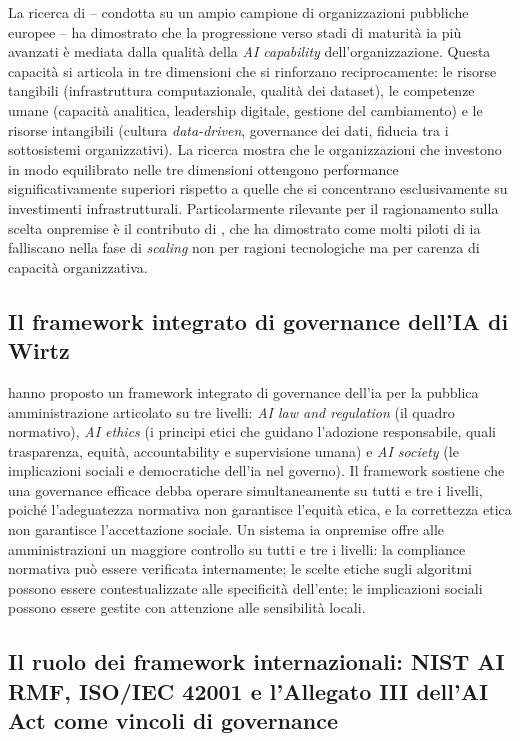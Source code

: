 La ricerca di \textcite{Mikalef2023} -- condotta su un ampio campione di organizzazioni pubbliche europee -- ha dimostrato che la progressione verso stadi di maturità \gls{ia} più avanzati è mediata dalla qualità della \textit{AI capability} dell'organizzazione. Questa capacità si articola in tre dimensioni che si rinforzano reciprocamente: le risorse tangibili (infrastruttura computazionale, qualità dei dataset), le competenze umane (capacità analitica, leadership digitale, gestione del cambiamento) e le risorse intangibili (cultura \textit{data-driven}, governance dei dati, fiducia tra i sottosistemi organizzativi). La ricerca mostra che le organizzazioni che investono in modo equilibrato nelle tre dimensioni ottengono performance significativamente superiori rispetto a quelle che si concentrano esclusivamente su investimenti infrastrutturali. Particolarmente rilevante per il ragionamento sulla scelta \gls{onpremise} è il contributo di \textcite{vanNoort2023}, che ha dimostrato come molti piloti di \gls{ia} falliscano nella fase di \textit{scaling} non per ragioni tecnologiche ma per carenza di capacità organizzativa.

\subsection{Il framework integrato di governance dell'IA di Wirtz}

\textcite{Wirtz2020} hanno proposto un framework integrato di governance dell'\gls{ia} per la pubblica amministrazione articolato su tre livelli: \textit{AI law and regulation} (il quadro normativo), \textit{AI ethics} (i principi etici che guidano l'adozione responsabile, quali trasparenza, equità, accountability e supervisione umana) e \textit{AI society} (le implicazioni sociali e democratiche dell'\gls{ia} nel governo). Il framework sostiene che una governance efficace debba operare simultaneamente su tutti e tre i livelli, poiché l'adeguatezza normativa non garantisce l'equità etica, e la correttezza etica non garantisce l'accettazione sociale. Un sistema \gls{ia} \gls{onpremise} offre alle amministrazioni un maggiore controllo su tutti e tre i livelli: la compliance normativa può essere verificata internamente; le scelte etiche sugli algoritmi possono essere contestualizzate alle specificità dell'ente; le implicazioni sociali possono essere gestite con attenzione alle sensibilità locali.

\subsection{Il ruolo dei framework internazionali: NIST AI RMF, ISO/IEC 42001 e l'Allegato III dell'AI Act come vincoli di governance}

